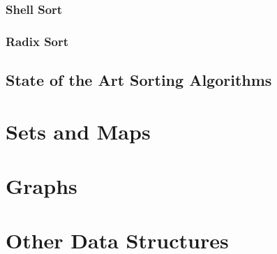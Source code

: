 \documentclass[10pt,a4paper]{book}
\begin{document}
\subsection{Shell Sort}

\subsection{Radix Sort}

\section{State of the Art Sorting Algorithms}


\chapter{Sets and Maps}
\chapter{Graphs}

\chapter{Other Data Structures}
\end{document}

